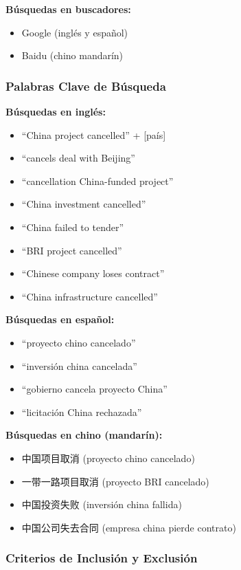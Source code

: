\documentclass[12pt]{article}
\begin{document}
\textbf{Búsquedas en buscadores:}
\begin{itemize}
    \item Google (inglés y español)
    \item Baidu (chino mandarín)
\end{itemize}

\subsubsection{Palabras Clave de Búsqueda}

\textbf{Búsquedas en inglés:}
\begin{itemize}
    \item ``China project cancelled'' + [país]
    \item ``cancels deal with Beijing''
    \item ``cancellation China-funded project''
    \item ``China investment cancelled''
    \item ``China failed to tender''
    \item ``BRI project cancelled''
    \item ``Chinese company loses contract''
    \item ``China infrastructure cancelled''
\end{itemize}

\textbf{Búsquedas en español:}
\begin{itemize}
    \item ``proyecto chino cancelado''
    \item ``inversión china cancelada''
    \item ``gobierno cancela proyecto China''
    \item ``licitación China rechazada''
\end{itemize}

\textbf{Búsquedas en chino (mandarín):}
\begin{itemize}
    \item 中国项目取消 (proyecto chino cancelado)
    \item 一带一路项目取消 (proyecto BRI cancelado)
    \item 中国投资失败 (inversión china fallida)
    \item 中国公司失去合同 (empresa china pierde contrato)
\end{itemize}

\subsubsection{Criterios de Inclusión y Exclusión}
\end{document}
